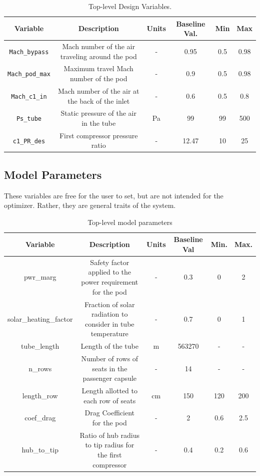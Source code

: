\documentclass[heading.tex]{subfiles}
\begin{document}
\begin{table} [H]
\begin{adjustwidth}{-2cm}{-2cm}
\begin{tabular}{|c|c|c|c|c|c|}
\hline 
Variable & Description & Units & Baseline Val. & Min & Max \\ 
\hline 
\texttt{Mach\_bypass} & Mach number of the air traveling around the pod & - & 0.95 & 0.5 & 0.98 \\ 
\hline 
\texttt{Mach\_pod\_max} & Maximum travel Mach number of the pod & - & 0.9 & 0.5 & 0.98 \\ 
\hline 
\texttt{Mach\_c1\_in} & Mach number of the air at the back of the inlet & - & 0.6 & 0.5 & 0.8 \\ 
\hline 
\texttt{Ps\_tube} & Static pressure of the air in the tube & Pa & 99 & 99 & 500 \\ 
\hline 
\texttt{c1\_PR\_des} & First compressor pressure ratio & - & 12.47 & 10 & 25 \\ 
\hline 
\end{tabular}
\end{adjustwidth}
 \caption[Design Variables]{Top-level Design Variables.}
\end{table}

\subsection{Model Parameters}
These variables are free for the user to set, but are not intended for the optimizer. Rather, they are general traits of the system.

\begin{table} [H]
\begin{adjustwidth}{-3cm}{-3cm}
\begin{tabular}{|c|c|c|c|c|c|}
\hline 
Variable & Description & Units & Baseline Val & Min. & Max. \\ 
\hline 
pwr\_marg & Safety factor applied to the power requirement for the pod & - & 0.3 & 0 & 2 \\ 
\hline 
solar\_heating\_factor & Fraction of solar radiation to consider in tube temperature & - & 0.7 & 0 & 1 \\ 
\hline 
tube\_length & Length of the tube & m & 563270 & - & - \\ 
\hline 
n\_rows & Number of rows of seats in the passenger capsule & - & 14 & - & - \\ 
\hline 
length\_row & Length allotted to each row of seats & cm & 150 & 120 & 200 \\ 
\hline 
coef\_drag & Drag Coefficient for the pod & - & 2 & 0.6 & 2.5 \\ 
\hline 
hub\_to\_tip & Ratio of hub radius to tip radius for the first compressor & - & 0.4 & 0.2 & 0.6 \\ 
\hline 
\end{tabular} 
\end{adjustwidth}
 \caption[Model Parameters]{Top-level model parameters}
\end{table}
\end{document}
